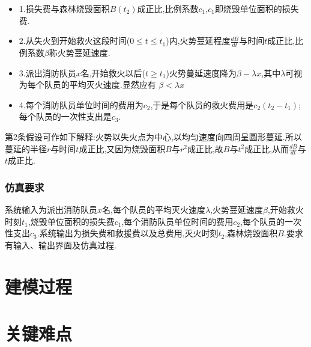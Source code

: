 \documentclass[UTF8]{article}
\begin{document}
        \begin{itemize}
            \item[]
            1.损失费与森林烧毁面积$B(t_2)$成正比,比例系数$c_1$,$c_1$即烧毁单位面积的损失费.

            \item[]
            2.从失火到开始救火这段时间($0 \leqslant t \leqslant t_1$)内,火势蔓延程度$\frac{dB}{dt}$与时间$t$成正比,比例系数$\beta$称火势蔓延速度.

            \item[]
            3.派出消防队员$x$名,开始救火以后($t \geqslant t_1$)火势蔓延速度降为$\beta - \lambda x$,其中$\lambda$可视为每个队员的平均灭火速度.显然应有 $\beta < \lambda x$

            \item[]
            4.每个消防队员单位时间的费用为$c_2$,于是每个队员的救火费用是$c_2(t_2-t_1)$;每个队员的一次性支出是$c_3$.
        \end{itemize}


        第2条假设可作如下解释:火势以失火点为中心,以均匀速度向四周呈圆形蔓延.所以蔓延的半径$r$与时间$t$成正比,又因为烧毁面积$B$与$r^2$成正比,故$B$与$t^2$成正比,从而$\frac{dB}{dt}$与$t$成正比.

    \subsubsection*{仿真要求}
        
        系统输入为派出消防队员$x$名,每个队员的平均灭火速度$\lambda$,火势蔓延速度$\beta$,开始救火时刻$t_1$,烧毁单位面积的损失费$c_1$,每个消防队员单位时间的费用$c_2$,每个队员的一次性支出$c_3$.系统输出为损失费和救援费以及总费用,灭火时刻$t_2$,森林烧毁面积$B$.要求有输入、输出界面及仿真过程.
        


   


    \section{建模过程}


    \section{关键难点}
\end{document}

